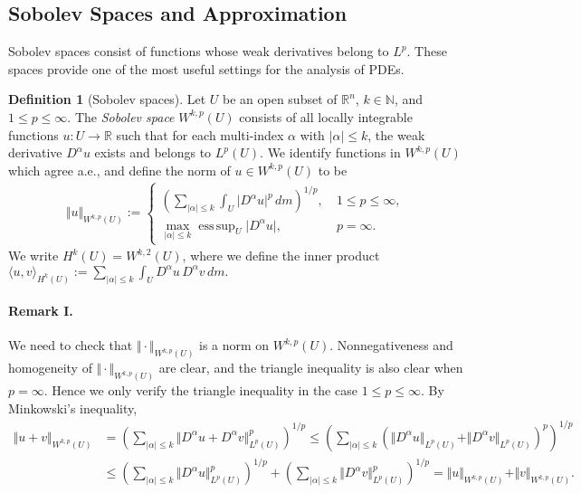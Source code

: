 \documentclass{article}
\numberwithin{equation}{section}
\newcommand{\bbN}{\mathbb{N}}
\newcommand{\bbR}{\mathbb{R}}
\DeclareMathOperator{\esssup}{ess\,sup}
\theoremstyle{plain}
\theoremstyle{definition}
\newtheorem{definition}[theorem]{Definition}
\begin{document}
\subsection{Sobolev Spaces and Approximation}
Sobolev spaces consist of functions whose weak derivatives belong to $L^p$. These spaces provide one of the most useful settings for the analysis of PDEs.
\begin{definition}[Sobolev spaces]\label{sobolevspace}
Let $U$ be an open subset of $\bbR^n$, $k\in\bbN$, and $1\leq p\leq\infty$. The \textit{Sobolev space} $W^{k,p}(U)$ consists of all locally integrable functions $u:U\to\bbR$ such that for each multi-index $\alpha$ with $\vert\alpha\vert\leq k$, the weak derivative $D^\alpha u$ exists and belongs to $L^p(U)$. We identify functions in $W^{k,p}(U)$ which agree a.e., and define the norm of $u\in W^{k,p}(U)$ to be \vspace{-0.07cm}
\begin{align*}
	\Vert u\Vert_{W^{k,p}(U)}:=\begin{cases}
		\left(\sum_{\vert\alpha\vert\leq k}\int_U\vert D^\alpha u\vert^p\,dm\right)^{1/p},\ &1\leq p\leq\infty,\\
		\max_{\vert\alpha\vert\leq k}\esssup_U\vert D^\alpha u\vert,\ &p=\infty.
	\end{cases}
\end{align*}
We write $H^k(U)=W^{k,2}(U)$, where we define the inner product $\displaystyle\langle u,v\rangle_{H^k(U)}:=\sum_{\vert\alpha\vert\leq k}\int_U D^\alpha u\,D^\alpha v\,dm.$
\end{definition}

\paragraph{Remark I.} We need to check that $\Vert\cdot\Vert_{W^{k,p}(U)}$ is a norm on $W^{k,p}(U)$. Nonnegativeness and homogeneity of $\Vert\cdot\Vert_{W^{k,p}(U)}$ are clear, and the triangle inequality is also clear when $p=\infty$. Hence we only verify the triangle inequality in the case $1\leq p\leq\infty$. By Minkowski's inequality,
\begin{align*}
\Vert u+v\Vert_{W^{k,p}(U)}&=\left(\sum_{\vert\alpha\vert\leq k}\Vert D^\alpha u+D^\alpha v\Vert_{L^p(U)}^p\right)^{1/p}\leq\left(\sum_{\vert\alpha\vert\leq k}\left(\Vert D^\alpha u\Vert_{L^p(U)}+\Vert D^\alpha v\Vert_{L^p(U)}\right)^p\right)^{1/p}\\
&\leq\left(\sum_{\vert\alpha\vert\leq k}\Vert D^\alpha u\Vert_{L^p(U)}^p\right)^{1/p}+\left(\sum_{\vert\alpha\vert\leq k}\Vert D^\alpha v\Vert_{L^p(U)}^p\right)^{1/p}=\Vert u\Vert_{W^{k,p}(U)}+\Vert v\Vert_{W^{k,p}(U)}.
\end{align*}
\end{document}
